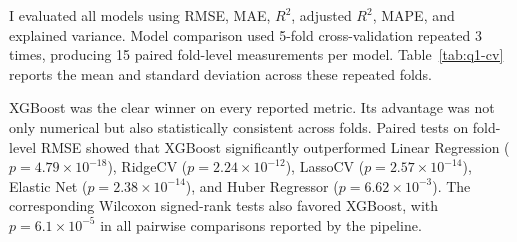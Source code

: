 I evaluated all models using RMSE, MAE, \(R^2\), adjusted \(R^2\), MAPE, and explained variance. Model comparison used 5-fold cross-validation repeated 3 times, producing 15 paired fold-level measurements per model. Table~\ref{tab:q1-cv} reports the mean and standard deviation across these repeated folds.

\begin{table}[htbp]
  \centering
  \caption{Repeated cross-validation results for Question 1.}
  \label{tab:q1-cv}
\end{table}

XGBoost was the clear winner on every reported metric. Its advantage was not only numerical but also statistically consistent across folds. Paired tests on fold-level RMSE showed that XGBoost significantly outperformed Linear Regression (\(p=4.79\times10^{-18}\)), RidgeCV (\(p=2.24\times10^{-12}\)), LassoCV (\(p=2.57\times10^{-14}\)), Elastic Net (\(p=2.38\times10^{-14}\)), and Huber Regressor (\(p=6.62\times10^{-3}\)). The corresponding Wilcoxon signed-rank tests also favored XGBoost, with \(p=6.1\times10^{-5}\) in all pairwise comparisons reported by the pipeline.

